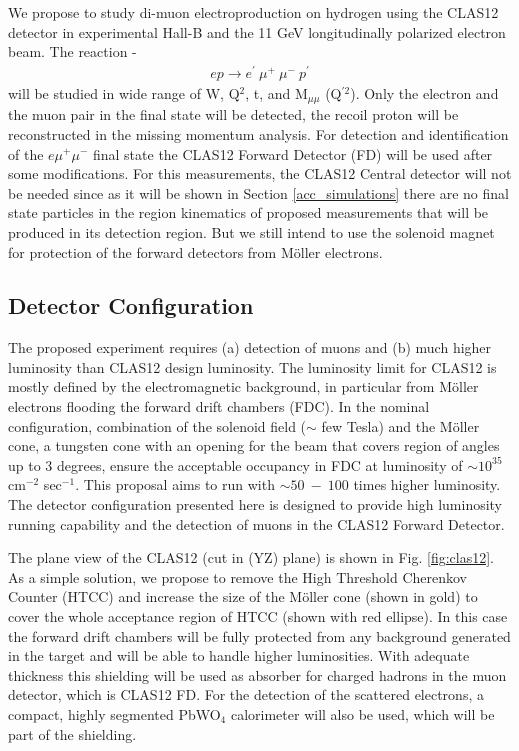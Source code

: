 \indent

We propose to study di-muon electroproduction on hydrogen using the CLAS12 detector in experimental Hall-B and the 11 GeV longitudinally polarized electron beam. The reaction - 
\begin{eqnarray}
ep\to e^\prime ~\mu^+ ~\mu^- ~p^\prime
\end{eqnarray}
will be studied in wide range of W, Q$^2$, t, and M$_{\mu\mu}$ (Q$^{\prime 2}$).  
Only the electron and the muon pair in the final state will be detected, the recoil proton will be reconstructed in the missing momentum analysis. For detection and identification of the $e\mu^+\mu^-$ final state the CLAS12 Forward Detector (FD) will be used after some modifications.
For this measurements, the CLAS12 Central detector will not be needed since as it will be shown in Section \ref{acc_simulations} there are no final state particles in the region kinematics of proposed measurements that will be produced in its detection region. But we still intend to use the solenoid magnet for protection of the forward detectors from M\"{o}ller electrons.


\subsection{Detector Configuration}
\indent

\label{detector}
The proposed experiment requires (a) detection of muons and (b) much higher luminosity than CLAS12 design luminosity. The luminosity limit for CLAS12 is mostly defined by the electromagnetic background, in particular from M\"{o}ller electrons flooding the forward drift chambers (FDC). In the nominal configuration, combination of the solenoid field ($\sim$ few Tesla) and the M\"{o}ller cone, a tungsten cone with an opening for the beam that covers region of angles up to $3$ degrees, ensure the acceptable occupancy in FDC at luminosity of $\sim 10^{35}$ cm$^{-2}$ sec$^{-1}$. This proposal aims to run with $\sim 50 ~-~ 100$ times higher luminosity. The detector configuration presented here is designed to provide high luminosity running capability and the detection of muons in the CLAS12 Forward Detector. 

The plane view of the CLAS12 (cut in (YZ) plane) is shown in Fig. \ref{fig:clas12}. As a simple solution, we propose to remove the High Threshold Cherenkov Counter (HTCC) and increase the size of the M\"{o}ller cone (shown in gold) to cover the whole acceptance region of HTCC (shown with red ellipse). In this case the forward drift chambers will be fully protected from any background generated in the target and will be able to handle higher luminosities. With adequate thickness this shielding will be used as absorber for charged hadrons in the muon detector, which is CLAS12 FD. For the detection of the scattered electrons, a compact, highly segmented PbWO$_4$ calorimeter will also be used, which will be part of the shielding.  

